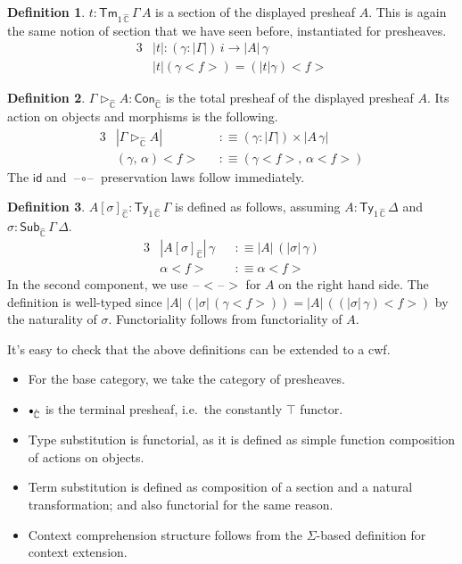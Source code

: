 \documentclass[12pt,a4paper,twoside,openany]{book}
\theoremstyle{remark}
\theoremstyle{definition}
\newtheorem{mydefinition}{Definition}
\newcommand{\mbb}[1]{\mathbb{#1}}
\newcommand{\id}{\mathsf{id}}
\newcommand{\Con}{\mathsf{Con}}
\newcommand{\Sub}{\mathsf{Sub}}
\newcommand{\Tm}{\mathsf{Tm}}
\newcommand{\Ty}{\mathsf{Ty}}
\newcommand{\blank}{\mathord{\hspace{1pt}\text{--}\hspace{1pt}}}
\newcommand{\ext}{\triangleright}
\newcommand{\emptycon}{\scaleobj{.75}\bullet}
\newcommand{\hmbbC}{\hat{\mbb{C}}}
\newcommand{\lab}{<\!}
\newcommand{\rab}{\!>}
\newcommand{\defn}{:\equiv}
\begin{document}
\begin{mydefinition}
$t : \Tm_{1\,\hmbbC}\,\Gamma\,A$ is a section of the displayed presheaf $A$. This is
again the same notion of section that we have seen before, instantiated for
presheaves.
\begin{alignat*}{3}
  & |t| : (\gamma : |\Gamma|)\,i \to |A|\,\gamma \\
  & |t|(\gamma\lab f \rab) = (|t|\gamma)\lab f \rab
\end{alignat*}
\end{mydefinition}

\begin{mydefinition}
$\Gamma \ext_{\hmbbC} A : \Con_{\hmbbC}$ is the total presheaf of the displayed presheaf $A$. Its action on objects and morphisms is the following.
\begin{alignat*}{3}
  &|\Gamma \ext_{\hmbbC} A| &&\defn (\gamma : |\Gamma|) \times |A\,\gamma|\\
  &(\gamma,\,\alpha)\lab f \rab &&\defn (\gamma\lab f \rab,\, \alpha\lab f \rab)
\end{alignat*}
The $\id$ and $\blank\!\circ\!\blank$ preservation laws follow immediately.
\end{mydefinition}

\begin{mydefinition}
$A[\sigma]_{\hmbbC} : \Ty_{1\,\hmbbC}\,\Gamma$ is defined as follows, assuming
$A : \Ty_{1\,\hmbbC}\,\Delta$ and $\sigma : \Sub_{\hmbbC}\,\Gamma\,\Delta$.
\begin{alignat*}{3}
  & |A[\sigma]_{\hmbbC}|\,\gamma &&\defn |A|\,(|\sigma|\,\gamma) \\
  & \alpha \lab f \rab &&\defn \alpha \lab f \rab
\end{alignat*}
In the second component, we use $\blank\lab\blank\rab$ for $A$ on the right hand
side.  The definition is well-typed since $|A|\,(|\sigma|\,(\gamma \lab f\rab))
= |A|\,((|\sigma|\,\gamma) \lab f \rab)$ by the naturality of
$\sigma$. Functoriality follows from functoriality of $A$.
\end{mydefinition}

It's easy to check that the above definitions can be extended to a cwf.
\begin{itemize}
  \item For the base category, we take the category of presheaves.
  \item $\emptycon_{\hmbbC}$ is the terminal presheaf, i.e.\ the constantly $\top$
        functor.
  \item Type substitution is functorial, as it is defined as simple function
    composition of actions on objects.
  \item Term substitution is defined as composition of a section and
    a natural transformation; and also functorial for the same reason.
  \item Context comprehension structure follows from the $\Sigma$-based definition for
    context extension.
\end{itemize}
\end{document}
